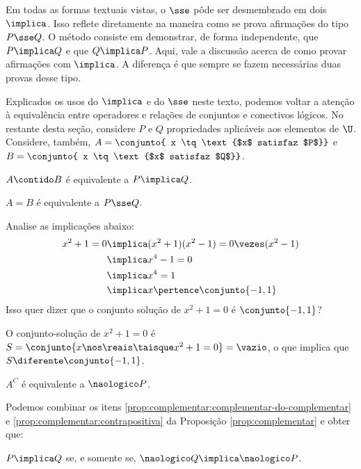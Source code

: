 Em todas as formas textuais vistas, o $\sse$ pôde ser desmembrado em dois $\implica$. Isso reflete diretamente na maneira como se prova afirmações do tipo $P \sse Q$. O método consiste em demonstrar, de forma independente, que $P \implica Q$ e que $Q \implica P$. Aqui, vale a discussão acerca de como provar afirmações com $\implica$. A diferença é que sempre se fazem necessárias duas provas desse tipo.

Explicados os usos do $\implica$  e do $\sse$ neste texto, podemos voltar a atenção à equivalência entre operadores e relações de conjuntos e conectivos lógicos. No restante desta seção, considere $P$ e $Q$ propriedades aplicáveis aos elementos de $\U$. Considere, também, $A = \conjunto{ x \tq \text{$x$ satisfaz $P$}}$ e $B = \conjunto{ x \tq \text{$x$ satisfaz $Q$}}$.

\begin{proposition} 
	$A \contido B$ é equivalente a $P \implica Q$.
\end{proposition}

\begin{proposition} 
	$A = B$ é equivalente a $P \sse Q$.
\end{proposition}

\begin{example}
	Analise as implicações abaixo:
	\begin{align*}
        x^2+1=0 &\implica (x^2+1)(x^2-1) = 0 \vezes (x^2-1) \\
                &\implica x^4 - 1 = 0 \\
                &\implica x^4 = 1 \\
                &\implica x \pertence \conjunto {-1, 1}
	\end{align*}
	Isso quer dizer que o conjunto solução de $x^2 +1 = 0$ é $\conjunto{-1, 1}$?
\end{example}

\begin{solution}
	O conjunto-solução de $x^2 + 1 = 0$ é $S = \conjunto{ x \nos \reais \taisque x^2 + 1 = 0} = \vazio$, o que implica que $S \diferente \conjunto{-1, 1}$.
\end{solution}

\begin{proposition} 
	$A^C$ é equivalente a $\naologico P$.
\end{proposition}

Podemos combinar os itens \ref{prop:complementar:complementar-do-complementar} e \ref{prop:complementar:contrapositiva} da Proposição \ref{prop:complementar} e obter que:
\begin{center}
    $P \implica Q$ se, e somente se, $\naologico Q \implica \naologico P$.
\end{center}

